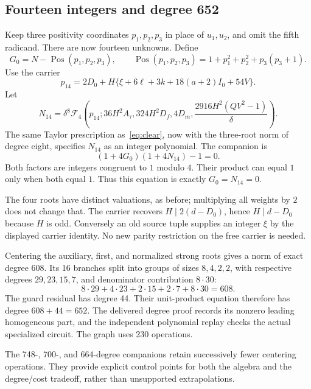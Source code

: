 \documentclass[11pt]{article}
\theoremstyle{remark}\newtheorem{remark}[theorem]{Remark}
\newcommand{\Pos}{\operatorname{Pos}}\newcommand{\ord}{\operatorname{ord}}
\begin{document}
\subsection{Fourteen integers and degree 652}
Keep three positivity coordinates $p_1,p_2,p_3$ in place of $u_1,u_2$,
and omit the fifth radicand. There are now fourteen unknowns. Define
\[
 G_0=N-\Pos(p_1,p_2,p_3),\qquad
 \Pos(p_1,p_2,p_3)=1+p_1^2+p_2^2+p_3(p_3+1).
\]
Use the carrier
\[
 p_{14}=2D_0+H\{\xi+6\ell+3k+18(a+2)I_0+54V\}.
\]
Let
\[
 N_{14}=\delta^8\mathcal F_4\left(
 p_{14};36H^2A_\tau,324H^2D_f,4D_m,
 \frac{2916H^2(QV^2-1)}\delta\right).
\]
The same Taylor prescription as~\eqref{eq:clear}, now with the three-root
norm of degree eight, specifies $N_{14}$ as an integer polynomial.
The companion is
\begin{equation}\label{eq:14}
 \boxed{\quad (1+4G_0)(1+4N_{14})-1=0.\quad}
\end{equation}
Both factors are integers congruent to $1$ modulo $4$. Their product can
equal $1$ only when both equal $1$. Thus this equation is exactly
$G_0=N_{14}=0$.

The four roots have distinct valuations, as before; multiplying all weights
by $2$ does not change that. The carrier recovers
$H\mid2(d-D_0)$, hence $H\mid d-D_0$ because $H$ is odd.
Conversely an old source tuple supplies an integer $\xi$ by the displayed
carrier identity. No new parity restriction on the free carrier is needed.

Centering the auxiliary, first, and normalized strong roots gives a norm of
exact degree 608. Its 16 branches split into groups of sizes $8,4,2,2$,
with respective degrees $29,23,15,7$, and denominator contribution $8\cdot30$:
\[
 8\cdot29+4\cdot23+2\cdot15+2\cdot7+8\cdot30=608.
\]
The guard residual has degree 44. Their unit-product equation therefore
has degree $608+44=652$. The delivered degree proof records its nonzero
leading homogeneous part, and the independent polynomial replay checks
the actual specialized circuit. The graph uses 230 operations.

The 748-, 700-, and 664-degree companions retain successively fewer
centering operations. They provide explicit control points for both the
algebra and the degree/cost tradeoff, rather than unsupported extrapolations.
\end{document}
